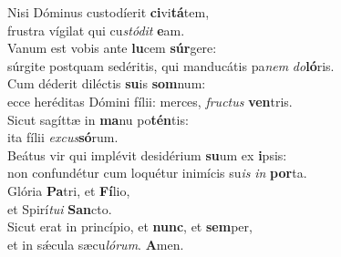 \evenverse Nisi Dóminus custodíerit \textbf{ci}vi\textbf{tá}tem,~\*\\
\evenverse frustra vígilat qui cu\textit{stó}\textit{dit} \textbf{e}am.\\
\oddverse Vanum est vobis ante \textbf{lu}cem \textbf{súr}gere:~\*\\
\oddverse súrgite postquam sedéritis, qui manducátis pa\textit{nem} \textit{do}\textbf{ló}ris.\\
\evenverse Cum déderit diléctis \textbf{su}is \textbf{som}num:~\*\\
\evenverse ecce heréditas Dómini fílii: merces, \textit{fru}\textit{ctus} \textbf{ven}tris.\\
\oddverse Sicut sagíttæ in \textbf{ma}nu po\textbf{tén}tis:~\*\\
\oddverse ita fílii \textit{ex}\textit{cus}\textbf{só}rum.\\
\evenverse Beátus vir qui implévit desidérium \textbf{su}um ex \textbf{i}psis:~\*\\
\evenverse non confundétur cum loquétur inimícis su\textit{is} \textit{in} \textbf{por}ta.\\
\oddverse Glória \textbf{Pa}tri, et \textbf{Fí}lio,~\*\\
\oddverse et Spirí\textit{tu}\textit{i} \textbf{San}cto.\\
\evenverse Sicut erat in princípio, et \textbf{nunc}, et \textbf{sem}per,~\*\\
\evenverse et in sǽcula sæcu\textit{ló}\textit{rum}. \textbf{A}men.\\
